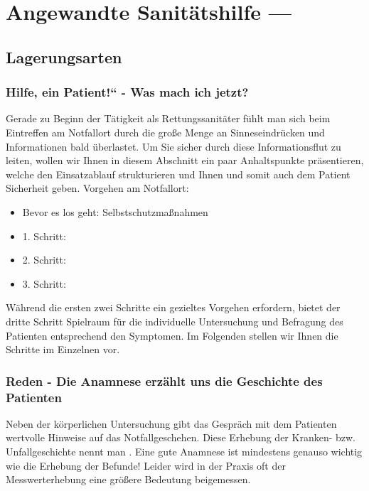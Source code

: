 \chapter{Angewandte Sanitätshilfe ---
}

\author{Gabriel, Hochreiter, Motal}

\minitoc

\section{Lagerungsarten}\label{topic:lagerungsarten}


\subsection{{\quotedblbase}Hilfe, ein Patient!{\textquotedblleft} - Was
mach{\textquotesingle} ich jetzt?}

Gerade zu Beginn der T\"atigkeit als Rettungssanit\"ater f\"uhlt man sich beim Eintreffen am Notfallort durch die große Menge an Sinneseindr\"ucken und Informationen bald \"uberlastet. Um Sie sicher durch diese Informationsflut zu leiten, wollen wir Ihnen in diesem Abschnitt ein paar Anhaltspunkte pr\"asentieren, welche den Einsatzablauf strukturieren und Ihnen und somit auch dem Patient Sicherheit geben.
Vorgehen am Notfallort:
\begin{itemize}
\item Bevor es los geht: Selbstschutzmaßnahmen
\item 1. Schritt: 
\item 2. Schritt: 
\item 3. Schritt: 
\end{itemize}
W\"ahrend die ersten zwei Schritte ein gezieltes Vorgehen erfordern, bietet der dritte Schritt Spielraum für die individuelle Untersuchung und Befragung des Patienten entsprechend den Symptomen. Im Folgenden stellen wir Ihnen die Schritte im Einzelnen vor.

\subsection{Reden - Die Anamnese erz\"ahlt uns die
Geschichte des Patienten}

Neben der k\"orperlichen Untersuchung gibt das Gespr\"ach mit dem Patienten wertvolle Hinweise auf das Notfallgeschehen. Diese Erhebung der Kranken- bzw. Unfallgeschichte nennt man . Eine gute Anamnese ist mindestens genauso wichtig wie die Erhebung der Befunde! Leider wird in der Praxis oft der Messwerterhebung eine gr\"oßere Bedeutung beigemessen.

